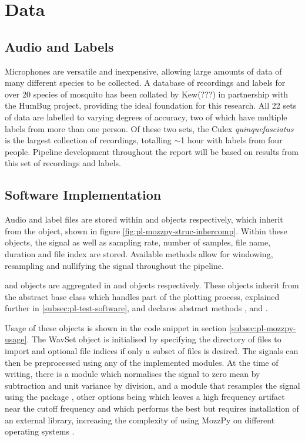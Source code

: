 \section{Data}
\label{sec:pl-data}

    \subsection{Audio and Labels}
    \label{subsec:pl-data-audiolbls}
        Microphones are versatile and inexpensive, allowing large amounts of data of many different species to be collected. A database of recordings and labels for over 20 species of mosquito has been collated by Kew(???) in partnership with the HumBug project, providing the ideal foundation for this research. All 22 sets of data are labelled to varying degrees of accuracy, two of which have multiple labels from more than one person. Of these two sets, the Culex \textit{quinquefasciatus} is the largest collection of recordings, totalling $\sim$1 hour with labels from four people. Pipeline development throughout the report will be based on results from this set of recordings and labels.
        
    \subsection{Software Implementation}
    \label{subsec:pl-data-software}
        Audio and label files are stored within  and  objects respectively, which inherit from the  object, shown in figure \ref{fig:pl-mozzpy-struc-inhercomp}. Within these objects, the signal as well as sampling rate, number of samples, file name, duration and file index are stored. Available methods allow for windowing, resampling and nullifying the signal throughout the pipeline. 
        
         and  objects are aggregated in  and  objects respectively. These objects inherit from the abstract base class  which handles part of the plotting process, explained further in \ref{subsec:pl-test-software}, and declares abstract methods ,  and .
        
        Usage of these objects is shown in the code snippet in section \ref{subsec:pl-mozzpy-usage}. The WavSet object is initialised by specifying the directory of  files to import and optional file indices if only a subset of files is desired. The signals can then be preprocessed using any of the implemented modules. At the time of writing, there is a  module which normalises the signal to zero mean by subtraction and unit variance by division, and a  module that resamples the signal using the  package \cite{BrianMcFee}, other options being  \cite{ScipyCommunity} which leaves a high frequency artifact near the cutoff frequency and  \cite{DavidCournapeau} which performs the best but requires installation of an external library, increasing the complexity of using MozzPy on different operating systems \cite{Thiemann}. 
        
